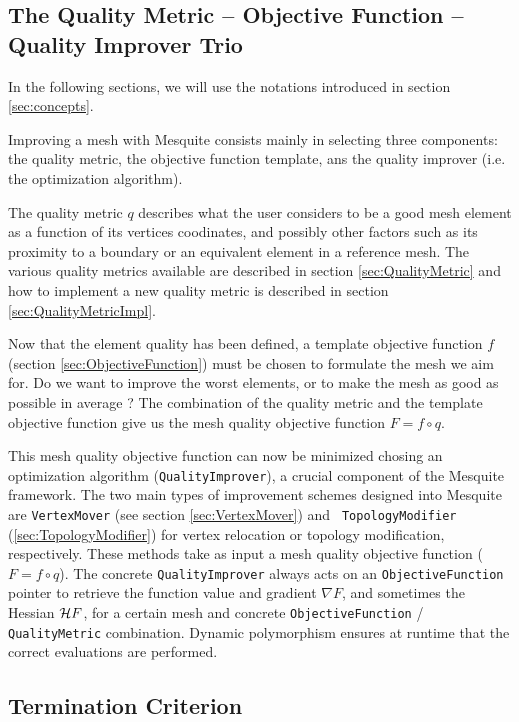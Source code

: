 \documentclass[letter]{report}
\begin{document}
\subsection{The Quality Metric -- Objective Function -- Quality Improver Trio} 
\label{sec:trio}

In the following sections, we will use the notations introduced in section \ref{sec:concepts}. 

Improving a mesh with Mesquite consists mainly in selecting three components: the quality metric,
the objective function template, ans the quality improver (i.e. the optimization algorithm). 

The quality metric $q$ describes what the user considers to be a good mesh element as a function of
its vertices coodinates, and possibly other factors such as its proximity to a boundary or an
equivalent element in a reference mesh. The various quality metrics available are described in
section \ref{sec:QualityMetric} and how to implement a new quality metric is described in section
\ref{sec:QualityMetricImpl}.

Now that the element quality has been defined, a template objective function $f$ (section
\ref{sec:ObjectiveFunction}) must be chosen to formulate the mesh we aim for. Do we want to improve
the worst elements, or to make the mesh as good as possible in average ? The combination of the
quality metric and the template objective function give us the mesh quality objective function $F=f
\circ q$.

This mesh quality objective function can now be minimized chosing an optimization algorithm
(\texttt{QualityImprover}), 
a crucial component of the Mesquite framework.  The two main types of improvement schemes
designed into Mesquite are {\tt VertexMover} (see section \ref{sec:VertexMover}) and {\tt
TopologyModifier} (\ref{sec:TopologyModifier}) for vertex relocation or topology modification,
respectively.  These methods take as input a mesh quality objective function ($F=f \circ q$).
The concrete \texttt{QualityImprover} always acts on an
\texttt{ObjectiveFunction} pointer to retrieve the function value and
gradient $\nabla F$, and sometimes the Hessian ${\cal H} F$, for a certain mesh and concrete \texttt{ObjectiveFunction} /
\texttt{QualityMetric} combination.  Dynamic polymorphism ensures at
runtime that the correct evaluations are performed.


\subsection{Termination Criterion}
\label{termination_section}
\end{document}
